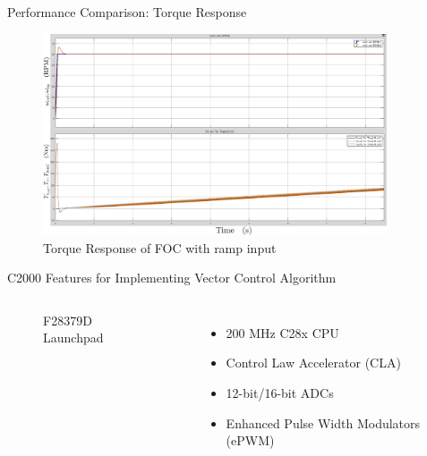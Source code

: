 \begin{frame}{Performance Comparison: Torque Response}
	\begin{figure}
		\includegraphics[width=4in]{conference/foc_60rpm.png} %
		\caption{Torque Response of FOC with ramp input}
	\end{figure}
\end{frame}


\begin{frame}{C2000 Features for Implementing Vector Control Algorithm}
	\begin{columns}
		\begin{minipage}[c]{\linewidth}
			\begin{figure}

				\centering
				\caption{F28379D Launchpad}

			\end{figure}
		\end{minipage}
		\begin{itemize}
			\item 200 MHz C28x CPU
			\item Control Law Accelerator (CLA)
			\item 12-bit/16-bit ADCs
			\item Enhanced Pulse Width Modulators (ePWM)
		\end{itemize}
	\end{columns}
\end{frame}

